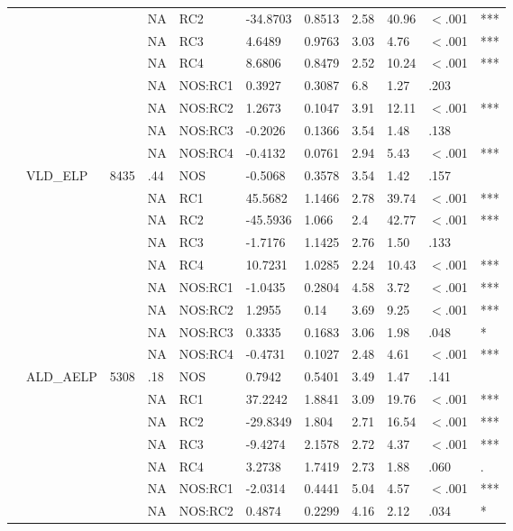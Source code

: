 \begin{table}[ht]
\begin{tabular}{lllllllllll}
   &  &  & NA & RC2 & -34.8703 & 0.8513 & 2.58 & 40.96 & $<$.001 & *** \\ 
   &  &  & NA & RC3 & 4.6489 & 0.9763 & 3.03 & 4.76 & $<$.001 & *** \\ 
   &  &  & NA & RC4 & 8.6806 & 0.8479 & 2.52 & 10.24 & $<$.001 & *** \\ 
   &  &  & NA & NOS:RC1 & 0.3927 & 0.3087 & 6.8 & 1.27 & .203 &   \\ 
   &  &  & NA & NOS:RC2 & 1.2673 & 0.1047 & 3.91 & 12.11 & $<$.001 & *** \\ 
   &  &  & NA & NOS:RC3 & -0.2026 & 0.1366 & 3.54 & 1.48 & .138 &   \\ 
   &  &  & NA & NOS:RC4 & -0.4132 & 0.0761 & 2.94 & 5.43 & $<$.001 & *** \\ 
   & VLD\_ELP & 8435 & .44 & NOS & -0.5068 & 0.3578 & 3.54 & 1.42 & .157 &   \\ 
   &  &  & NA & RC1 & 45.5682 & 1.1466 & 2.78 & 39.74 & $<$.001 & *** \\ 
   &  &  & NA & RC2 & -45.5936 & 1.066 & 2.4 & 42.77 & $<$.001 & *** \\ 
   &  &  & NA & RC3 & -1.7176 & 1.1425 & 2.76 & 1.50 & .133 &   \\ 
   &  &  & NA & RC4 & 10.7231 & 1.0285 & 2.24 & 10.43 & $<$.001 & *** \\ 
   &  &  & NA & NOS:RC1 & -1.0435 & 0.2804 & 4.58 & 3.72 & $<$.001 & *** \\ 
   &  &  & NA & NOS:RC2 & 1.2955 & 0.14 & 3.69 & 9.25 & $<$.001 & *** \\ 
   &  &  & NA & NOS:RC3 & 0.3335 & 0.1683 & 3.06 & 1.98 & .048 & * \\ 
   &  &  & NA & NOS:RC4 & -0.4731 & 0.1027 & 2.48 & 4.61 & $<$.001 & *** \\ 
   & ALD\_AELP & 5308 & .18 & NOS & 0.7942 & 0.5401 & 3.49 & 1.47 & .141 &   \\ 
   &  &  & NA & RC1 & 37.2242 & 1.8841 & 3.09 & 19.76 & $<$.001 & *** \\ 
   &  &  & NA & RC2 & -29.8349 & 1.804 & 2.71 & 16.54 & $<$.001 & *** \\ 
   &  &  & NA & RC3 & -9.4274 & 2.1578 & 2.72 & 4.37 & $<$.001 & *** \\ 
   &  &  & NA & RC4 & 3.2738 & 1.7419 & 2.73 & 1.88 & .060 & . \\ 
   &  &  & NA & NOS:RC1 & -2.0314 & 0.4441 & 5.04 & 4.57 & $<$.001 & *** \\ 
   &  &  & NA & NOS:RC2 & 0.4874 & 0.2299 & 4.16 & 2.12 & .034 & * \\ 

\end{tabular}
\end{table}
